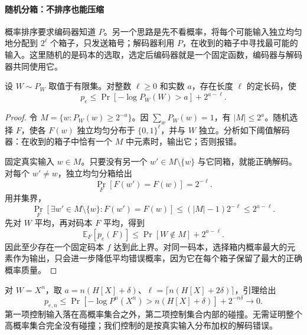 \documentclass[lang=cn,a4paper,fontset=none,zihao=false,10pt,openany,twoside]{beautybook}
\numberwithin{algorithm}{chapter}
\begin{document}
\paragraph{随机分箱：不排序也能压缩}
概率排序要求编码器知道 $P$。另一个思路是先不看概率，将每个可能输入独立均匀地分配到 $2^\ell$ 个箱子，只发送箱号；解码器利用 $P$，在收到的箱子中寻找最可能的输入。这里随机的是码本的选取，选定后编码器就是一个固定函数，编码器与解码器共同使用它。
\begin{lemma}[随机分箱的错误界]\label{lem:random-binning}
设 $W\sim P_W$ 取值于有限集。对整数 $\ell\ge0$ 和实数 $a$，存在长度 $\ell$ 的定长码，使
\[
 p_e\le\Pr[-\log P_W(W)>a]+2^{a-\ell}.
\]
\end{lemma}
\begin{proof}
令 $M=\{w:P_W(w)\ge2^{-a}\}$。因 $\sum_wP_W(w)=1$，有 $|M|\le2^a$。随机选择 $F$，使各 $F(w)$ 独立均匀分布于 $\{0,1\}^\ell$，并与 $W$ 独立。分析如下阈值解码器：在收到的箱子中恰有一个 $M$ 中元素时，输出它；否则报错。

固定真实输入 $w\in M$。只要没有另一个 $w'\in M\setminus\{w\}$ 与它同箱，就能正确解码。对每个 $w'\ne w$，独立均匀分箱给出
\[
 \Pr_F[F(w')=F(w)]=2^{-\ell}.
\]
用并集界，
\[
 \Pr_F[\exists w'\in M\setminus\{w\}:F(w')=F(w)]
 \le(|M|-1)2^{-\ell}\le2^{a-\ell}.
\]
先对 $W$ 平均，再对码本 $F$ 平均，得到
\[
 \mathbb E_F[p_e(F)]\le\Pr[W\notin M]+2^{a-\ell}.
\]
因此至少存在一个固定码本 $f$ 达到此上界。对同一码本，选择箱内概率最大的元素作为输出，只会进一步降低平均错误概率，因为它在每个箱子保留了最大的正确概率质量。
\end{proof}
\begin{center}
\end{center}
对 $W=X^n$，取 $a=n(H[X]+\delta)$、$\ell=\lceil n(H[X]+2\delta)\rceil$，引理给出
\[
 p_{e,n}\le\Pr[-\log P^n(X^n)>n(H[X]+\delta)]+2^{-n\delta}\to0.
\]
第一项控制输入落在高概率集合之外，第二项控制集合内部的碰撞。无需证明整个高概率集合完全没有碰撞；我们控制的是按真实输入分布加权的解码错误。
\end{document}
